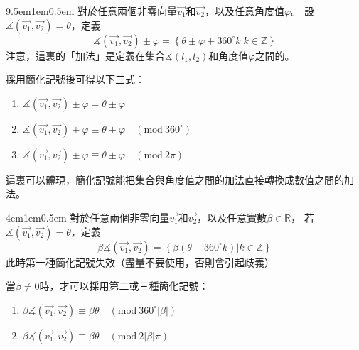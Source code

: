 \documentclass[12pt]{article}
\begin{document}
\begin{mybox}[集合-角度值加法]{9.5em}{1em}{0.5em}
    對於任意兩個非零向量$\overrightarrow{v_1}$和$\overrightarrow{v_2}$，以及任意角度值$\varphi$。
    設$\measuredangle{\left(\overrightarrow{v_1},\overrightarrow{v_2}\right)}=\theta$，定義
    $$
        \measuredangle{\left(\overrightarrow{v_1},\overrightarrow{v_2}\right)}\pm\varphi=\left\{\theta\pm\varphi+360^{\circ}k\left|k\in\mathbb{Z}\right.\right\}
    $$
    注意，這裏的「加法」是定義在集合$\measuredangle{\left(l_1,l_2\right)}$和角度值$\varphi$之間的。
    
    採用簡化記號後可得以下三式：
    \begin{enumerate}
        \item $\measuredangle{\left(\overrightarrow{v_1},\overrightarrow{v_2}\right)}\pm\varphi=\theta\pm\varphi$
        \item $\measuredangle{\left(\overrightarrow{v_1},\overrightarrow{v_2}\right)}\pm\varphi\equiv\theta\pm\varphi\quad\left(\text{mod}\ {360^{\circ}}\right)$
        \item $\measuredangle{\left(\overrightarrow{v_1},\overrightarrow{v_2}\right)}\pm\varphi\equiv\theta\pm\varphi\quad\left(\text{mod}\ {2\pi}\right)$
    \end{enumerate}
    這裏可以體現，簡化記號能把集合與角度值之間的加法直接轉換成數值之間的加法。
\end{mybox}
\begin{mybox}[乘法]{4em}{1em}{0.5em}
    對於任意兩個非零向量$\overrightarrow{v_1}$和$\overrightarrow{v_2}$，以及任意實數$\beta\in\mathbb{R}$，
    若$\measuredangle{\left(\overrightarrow{v_1},\overrightarrow{v_2}\right)}=\theta$，定義
    $$
        \beta\measuredangle{\left(\overrightarrow{v_1},\overrightarrow{v_2}\right)}=\left\{\beta\left(\theta+360^{\circ}k\right)\left|k\in\mathbb{Z}\right.\right\}
    $$
    此時第一種簡化記號失效（盡量不要使用，否則會引起歧義）

    當$\beta\neq0$時，才可以採用第二或三種簡化記號：
    \begin{enumerate}[start=2]
        \item $\beta\measuredangle{\left(\overrightarrow{v_1},\overrightarrow{v_2}\right)}\equiv\beta\theta\quad\left(\text{mod}\ {360^{\circ}|\beta|}\right)$
        \item $\beta\measuredangle{\left(\overrightarrow{v_1},\overrightarrow{v_2}\right)}\equiv\beta\theta\quad\left(\text{mod}\ {2|\beta|\pi}\right)$
    \end{enumerate}
\end{mybox}
\end{document}
